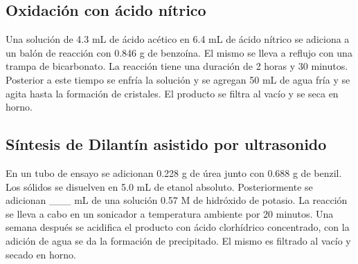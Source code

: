 \documentclass[fleqn,10pt]{SelfArx}
\begin{document}
\subsection{Oxidaci\'on con \'acido n\'itrico}
Una soluci\'on de 4.3 mL de \'acido ac\'etico en 6.4 mL de \'acido n\'itrico se adiciona a un bal\'on de reacci\'on con 0.846 g de benzo\'ina. El mismo se lleva a reflujo con una trampa de bicarbonato. La reacci\'on tiene una duraci\'on de 2 horas y 30 minutos. Posterior a este tiempo se enfr\'ia la soluci\'on y se agregan 50 mL de agua fr\'ia y se agita hasta la formaci\'on de cristales. El producto se filtra al vac\'io y se seca en horno.

\subsection{S\'intesis de Dilant\'in asistido por ultrasonido}
En un tubo de ensayo se adicionan 0.228 g de \'urea junto con 0.688 g de benzil. Los s\'olidos se disuelven en 5.0 mL de etanol absoluto. Posteriormente se adicionan \_\_\_ mL de una soluci\'on 0.57 M de hidr\'oxido de potasio. La reacci\'on se lleva a cabo en un sonicador a temperatura ambiente por 20 minutos. Una semana despu\'es se acidifica el producto con \'acido clorh\'idrico concentrado, con la adici\'on de agua se da la formaci\'on de precipitado. El mismo es filtrado al vac\'io y secado en horno. 



\newpage
\onecolumn
\end{document}

